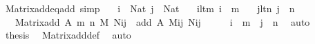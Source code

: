 \begin{isabellebody}
\endisatagproof
{\isafoldproof}%
%
\isadelimproof
\isanewline
%
\endisadelimproof
\isanewline
{}\isamarkupfalse%
\ Matrix{\isacharunderscore}{\kern0pt}add{\isacharunderscore}{\kern0pt}eq{\isacharunderscore}{\kern0pt}add\ {\isacharbrackleft}{\kern0pt}simp{\isacharbrackright}{\kern0pt}{\isacharcolon}{\kern0pt}\isanewline
\ \ \ {\isachardoublequoteopen}i\ {\isacharcolon}{\kern0pt}\ Nat{\isachardoublequoteclose}\ {\isachardoublequoteopen}j\ {\isacharcolon}{\kern0pt}\ Nat{\isachardoublequoteclose}\isanewline
\ \ \ i{\isacharunderscore}{\kern0pt}lt{\isacharunderscore}{\kern0pt}m{\isacharcolon}{\kern0pt}\ {\isachardoublequoteopen}i\ {\isacharless}{\kern0pt}\ m{\isachardoublequoteclose}\isanewline
\ \ \ j{\isacharunderscore}{\kern0pt}lt{\isacharunderscore}{\kern0pt}n{\isacharcolon}{\kern0pt}\ {\isachardoublequoteopen}j\ {\isacharless}{\kern0pt}\ n{\isachardoublequoteclose}\isanewline
\ \ \ {\isachardoublequoteopen}{\isacharparenleft}{\kern0pt}Matrix{\isacharunderscore}{\kern0pt}add\ A\ m\ n\ M\ N{\isacharparenright}{\kern0pt}{\isacharbackquote}{\kern0pt}i{\isacharbackquote}{\kern0pt}j\ {\isacharequal}{\kern0pt}\ add\ A\ {\isacharparenleft}{\kern0pt}M{\isacharbackquote}{\kern0pt}i{\isacharbackquote}{\kern0pt}j{\isacharparenright}{\kern0pt}\ {\isacharparenleft}{\kern0pt}N{\isacharbackquote}{\kern0pt}i{\isacharbackquote}{\kern0pt}j{\isacharparenright}{\kern0pt}{\isachardoublequoteclose}\isanewline
%
\isadelimproof
%
\endisadelimproof
%
\isatagproof
{}\isamarkupfalse%
\ {\isacharminus}{\kern0pt}\isanewline
\ \ \isamarkupfalse%
\ {\isachardoublequoteopen}i\ {\isasymin}\ {\isacharbrackleft}{\kern0pt}{}{\isacharcomma}{\kern0pt}{\isasymdots}{\isacharcomma}{\kern0pt}m{\isacharbrackleft}{\kern0pt}{\isachardoublequoteclose}\ \ {\isachardoublequoteopen}j\ {\isasymin}\ {\isacharbrackleft}{\kern0pt}{}{\isacharcomma}{\kern0pt}{\isasymdots}{\isacharcomma}{\kern0pt}n{\isacharbrackleft}{\kern0pt}{\isachardoublequoteclose}\ \isamarkupfalse%
\ auto\isanewline
\ \ \isamarkupfalse%
\ \isamarkupfalse%
\ {\isacharquery}{\kern0pt}thesis\ \isamarkupfalse%
\ Matrix{\isacharunderscore}{\kern0pt}add{\isacharunderscore}{\kern0pt}def\ \isamarkupfalse%
\ auto\isanewline
{}\isamarkupfalse%
%
\endisatagproof
{\isafoldproof}%
%
\isadelimproof
\isanewline
%
\endisadelimproof
\isanewline
\isanewline
\isanewline
\isanewline
{}\isamarkupfalse%

\end{isabellebody}
